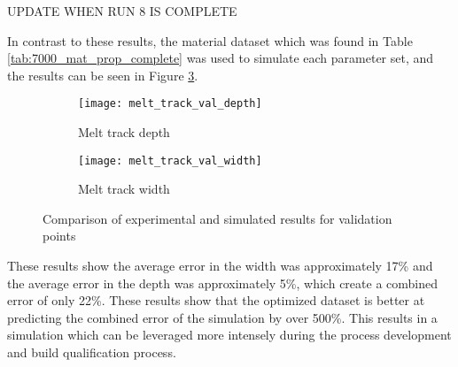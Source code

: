 UPDATE WHEN RUN 8 IS COMPLETE

In contrast to these results, the material dataset which was found in Table \ref{tab:7000_mat_prop_complete} was used to simulate each parameter set, and the results can be seen in Figure \ref{fig:melt_track_val}.
\begin{figure}[!htb]\centering
	\begin{subfigure}[c]{0.45\textwidth}\centering
	\texttt{[image: melt\_track\_val\_depth]}
	\caption{Melt track depth}
	\label{fig:melt_track_val_depth}
	\end{subfigure}\hfill{}
		\begin{subfigure}[c]{0.45\textwidth}\centering
		\texttt{[image: melt\_track\_val\_width]}
		\caption{Melt track width}
		\label{fig:melt_track_val_width}
		\end{subfigure}
	\caption{Comparison of experimental and simulated results for validation points}
	\label{fig:melt_track_val}
\end{figure}
These results show the average error in the width was approximately 17\% and the average error in the depth was approximately 5\%, which create a combined error of only 22\%.  These results show that the optimized dataset is better at predicting the combined error of the simulation by over 500\%.  This results in a simulation which can be leveraged more intensely during the process development and build qualification process.  
